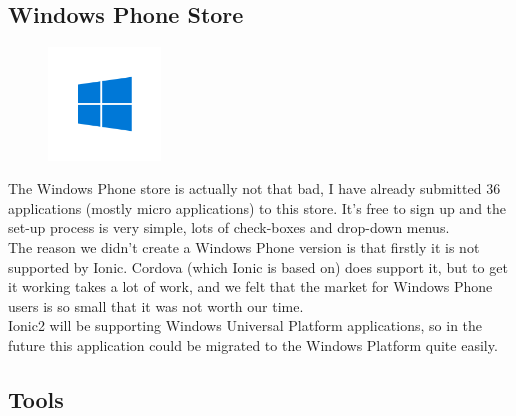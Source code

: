 \subsection{Windows Phone Store}
\begin{figure}
	\includegraphics[width=3cm]{img/mobile-app/logos/windows.png}
\end{figure} 
The Windows Phone store \cite{windows_phone} is actually not that bad, I have already submitted 36 applications (mostly micro applications) to this store.
It's free to sign up and the set-up process is very simple, lots of check-boxes and drop-down menus.
\\
The reason we didn't create a Windows Phone version is that firstly it is not supported by Ionic. Cordova (which Ionic is based on) does support it, but to get it working takes a lot of work, and we felt that the market for Windows Phone users is so small that it was not worth our time.
\\
Ionic2 will be supporting Windows Universal Platform applications, so in the future this application could be migrated to the Windows Platform quite easily.

\subsection{Tools}
